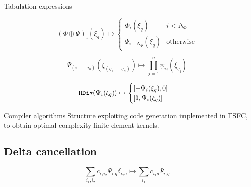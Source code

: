 \documentclass[a0paper,portrait]{baposter}
\begin{document}
\begin{poster}
\begin{posterbox}[name=structure, column=0, below=introduction, span=3]{Tabulation expressions}
\begin{tcbraster}[raster columns=6,raster equal height=rows]
\begin{tcolorbox}[title=Enriched,left=0mm,right=0mm,top=0mm,bottom=0mm,boxsep=0.5mm,
      raster multicolumn=4, valign upper=center]
      \begin{equation*}
        {(\Phi \oplus \Psi)}_i(\xi_q) \mapsto
        \begin{cases}
          \Phi_i(\xi_q) &\text{$i < N_\Phi$}\\
          \Psi_{i-N_\Phi}(\xi_q) &\text{otherwise}
        \end{cases}
      \end{equation*}
    \end{tcolorbox}
    \begin{tcolorbox}[title=Tensor product,left=0mm,right=0mm,top=0mm,bottom=0mm,boxsep=0.5mm,
      raster multicolumn=3, valign upper=center]
      \begin{equation*}
        \Psi_{(i_1, \dots, i_n)}(\xi_{(q_1, \dots, q_n)}) \mapsto \prod_{j=1}^{n} \psi_{i_j}(\xi_{q_j})
      \end{equation*}
    \end{tcolorbox}
    \begin{tcolorbox}[title=$\mathbf{H}(\text{div}/\text{curl})$,left=0mm,right=0mm,top=0mm,bottom=0mm,boxsep=0.5mm,
      raster multicolumn=3, valign upper=center]
      \begin{equation*}
        \text{\texttt{HDiv}}(\Psi_i(\xi_q)) \mapsto
        \begin{cases}
          [-\Psi_i(\xi_q), 0]\\
          [0, \Psi_i(\xi_q)]
        \end{cases}
      \end{equation*}
    \end{tcolorbox}
  \end{tcbraster}
  \end{posterbox}

  \begin{posterbox}[name=rules, column=0, below=structure, span=3]{Compiler algorithms}
    Structure exploiting code generation implemented in TSFC, to
    obtain optimal complexity finite element kernels.

    \vspace{-\baselineskip}
    \subsection*{Delta cancellation}
    \vspace{-0.5em}
    \begin{equation*}
      \sum_{i_1, i_2} c_{i_1 i_2} \Psi_{i_1 q}
      \delta_{i_2 a} \mapsto \sum_{i_1} c_{i_1 a}\Psi_{i_1 q}
    \end{equation*}
    \vspace{-1.2\baselineskip}

\end{posterbox}
\end{poster}
\end{document}
